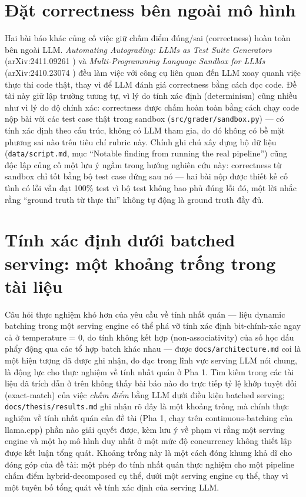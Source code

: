 \documentclass[a4paper,12pt]{report}
\begin{document}
\section{Đặt correctness bên ngoài mô hình}

Hai bài báo khác củng cố việc giữ chấm điểm đúng/sai (correctness) hoàn
toàn bên ngoài LLM. \textit{Automating Autograding: LLMs as Test Suite
Generators} (arXiv:2411.09261 \cite{autograding_test_suites}) và
\textit{Multi-Programming Language Sandbox for LLMs} (arXiv:2410.23074
\cite{multi_lang_sandbox}) đều làm việc với công cụ liên quan đến LLM xoay
quanh việc thực thi code thật, thay vì để LLM đánh giá correctness bằng
cách đọc code. Đề tài này giữ lập trường tương tự, vì lý do tính xác định
(determinism) cũng nhiều như vì lý do độ chính xác: correctness được chấm
hoàn toàn bằng cách chạy code nộp bài với các test case thật trong sandbox
(\texttt{src/grader/sandbox.py}) — có tính xác định theo cấu trúc, không
có LLM tham gia, do đó không có bề mặt phương sai nào trên tiêu chí rubric
này. Chính ghi chú xây dựng bộ dữ liệu (\texttt{data/script.md}, mục
``Notable finding from running the real pipeline'') cũng độc lập củng cố
một lưu ý ngầm trong hướng nghiên cứu này: correctness từ sandbox chỉ tốt
bằng bộ test case đứng sau nó — hai bài nộp được thiết kế cố tình có lỗi
vẫn đạt 100\% test vì bộ test không bao phủ đúng lỗi đó, một lời nhắc rằng
``ground truth từ thực thi'' không tự động là ground truth đầy đủ.

\section{Tính xác định dưới batched serving: một khoảng trống trong tài liệu}
\label{sec:determinism-gap}

Câu hỏi thực nghiệm khó hơn của yêu cầu về tính nhất quán — liệu dynamic
batching trong một serving engine có thể phá vỡ tính xác định bit-chính-xác
ngay cả ở temperature = 0, do tính không kết hợp (non-associativity) của
số học dấu phẩy động qua các tổ hợp batch khác nhau — được
\texttt{docs/architecture.md} coi là một hiện tượng đã được ghi nhận, đo
đạc trong lĩnh vực serving LLM nói chung, là động lực cho thực nghiệm về
tính nhất quán ở Pha 1. Tìm kiếm trong các tài liệu đã trích dẫn ở trên
không thấy bài báo nào đo trực tiếp tỷ lệ khớp tuyệt đối (exact-match) của
việc \emph{chấm điểm} bằng LLM dưới điều kiện batched serving;
\texttt{docs/thesis/results.md} ghi nhận rõ đây là một khoảng trống mà
chính thực nghiệm về tính nhất quán của đề tài (Pha 1, chạy trên
continuous-batching của llama.cpp) phần nào giải quyết được, kèm lưu ý về
phạm vi rằng một serving engine và một họ mô hình duy nhất ở một mức độ
concurrency không thiết lập được kết luận tổng quát. Khoảng trống này là
một cách đóng khung khả dĩ cho đóng góp của đề tài: một phép đo tính nhất
quán thực nghiệm cho một pipeline chấm điểm hybrid-decomposed cụ thể, dưới
một serving engine cụ thể, thay vì một tuyên bố tổng quát về tính xác định
của serving LLM.
\end{document}
